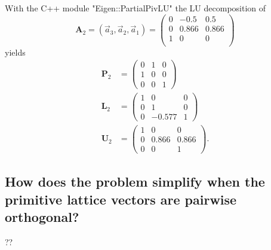 With the C++ module "Eigen::PartialPivLU" the LU decomposition of
\begin{equation}
    \symbf{A}_2 = (\vec{a}_3,\vec{a}_2,\vec{a}_1) =
    \begin{pmatrix}
        0 & -0.5 & 0.5 \\
        0 & 0.866 & 0.866 \\
        1 & 0 & 0 \\
    \end{pmatrix}
\end{equation}
yields
\begin{align}
    \symbf{P}_2 &= 
    \begin{pmatrix}
        0 & 1 & 0 \\
        1 & 0 & 0 \\
        0 & 0 & 1
    \end{pmatrix} \\
    \symbf{L}_2 &=
    \begin{pmatrix}
        1 & 0 & 0 \\
        0 & 1 & 0 \\
        0 & -0.577 & 1
    \end{pmatrix} \\
    \symbf{U}_2 &=
    \begin{pmatrix}
        1 & 0 & 0 \\
        0 & 0.866 & 0.866 \\
        0 & 0 & 1
    \end{pmatrix} .
\end{align}

\subsection{How does the problem simplify when the primitive lattice vectors are pairwise orthogonal?}

??